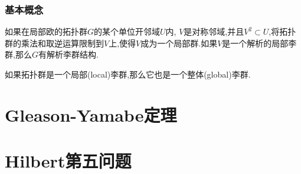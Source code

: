 \documentclass[aspectratio=169, 10pt, utf8, mathserif]{beamer}
\begin{document}
\begin{frame}[plain]
	\frametitle{基本概念}
	\begin{Theorem}
		如果在局部欧的拓扑群$G$的某个单位开邻域$U$内, $V$是对称邻域,并且$V^2\subset U$,将拓扑群的乘法和取逆运算限制到$V$上,使得$V$成为一个局部群.如果$V$是一个解析的局部李群,那么$G$有解析李群结构.
	\end{Theorem}
	如果拓扑群是一个局部(local)李群,那么它也是一个整体(global)李群.
\end{frame}

\section{Gleason-Yamabe定理}
\section{Hilbert第五问题}
\begin{frame}
\end{frame}
\end{document}
